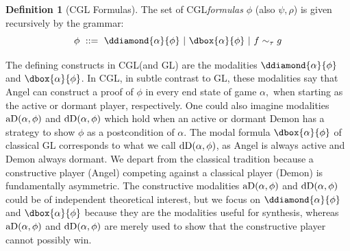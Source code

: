 \documentclass[12pt]{cmuthesis}
\theoremstyle{definition}
\newtheorem{definition}{Definition}
\theoremstyle{remark}
\newcommand{\bebecomes}{\mathrel{::=}}
\newcommand{\alternative}{~|~}
\newcommand{\CGL}{\textsf{CGL}\xspace}
\newcommand{\GL}{GL\xspace}
\begin{document}

\begin{definition}[\CGL Formulas]
The set of \CGL \emph{formulas} $\phi$ (also $\psi, \rho$) is given recursively by the grammar:
\[ \phi ~\bebecomes~ \ddiamond{\alpha}{\phi} \alternative \dbox{\alpha}{\phi} \alternative f \sim_\tau g\]
\label{def:cgl-formula}
\end{definition}
The defining constructs in \CGL (and \GL) are the modalities $\ddiamond{\alpha}{\phi}$ and $\dbox{\alpha}{\phi}$.
In \CGL, in subtle contrast to \GL, these modalities say that Angel can construct a proof of $\phi$ in every end state of game $\alpha,$ when starting as the active or dormant player, respectively.
One could also imagine modalities $\textrm{aD}(\alpha,\phi)$ and $\textrm{dD}(\alpha,\phi)$ which hold when an active or dormant Demon has a strategy to show $\phi$ as a postcondition of $\alpha$.
The modal formula $\dbox{\alpha}{\phi}$ of classical \GL corresponds to what we call $\textrm{dD}(\alpha,\phi)$, as Angel is always active and Demon always dormant.
We depart from the classical tradition because a constructive player (Angel) competing against a classical player (Demon) is fundamentally asymmetric.
The constructive modalities $\textrm{aD}(\alpha,\phi)$ and $\textrm{dD}(\alpha,\phi)$ could be of independent theoretical interest, but we focus on $\ddiamond{\alpha}{\phi}$ and $\dbox{\alpha}{\phi}$ because they are the modalities useful for synthesis, whereas $\textrm{aD}(\alpha,\phi)$ and $\textrm{dD}(\alpha,\phi)$ are merely used to show that the constructive player cannot possibly win.
\end{document}
